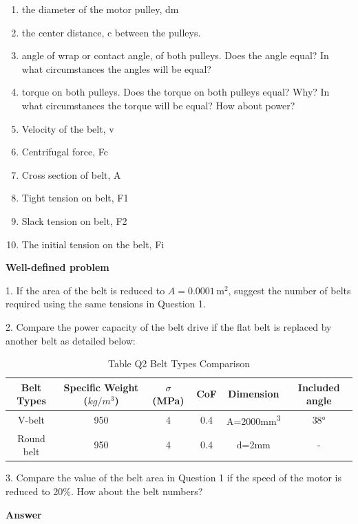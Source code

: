 \documentclass[a4paper, fleqn]{article}
\begin{document}
\begin{enumerate}[label=(\roman*)]
    \item the diameter of the motor pulley, dm
    \item the center distance, c between the pulleys.
    \item angle of wrap or contact angle, of both pulleys. Does the angle equal? In what circumstances the angles will be equal?
    \item torque on both pulleys. Does the torque on both pulleys equal? Why? In what circumstances the torque will be equal? How about power?
    \item Velocity of the belt, v
    \item Centrifugal force, Fc
    \item Cross section of belt, A
    \item Tight tension on belt, F1
    \item Slack tension on belt, F2
    \item The initial tension on the belt, Fi
\end{enumerate}

\newpage

\textbf{Well-defined problem}
\vspace{10pt}

1.	If the area of the belt is reduced to $A=0.0001 \, \text{m}^2$, suggest the number of belts required using the same tensions in Question 1.

2.	Compare the power capacity of the belt drive if the flat belt is replaced by another belt as detailed below: 

\begin{table}[h]
\centering
\begin{tabular}{|c|c|c|c|c|c|}
\hline
Belt Types & Specific Weight ($kg/m^3$) & $\sigma$ (MPa) & CoF & Dimension & Included angle \\
\hline
V-belt & 950 & 4 & 0.4 & A=2000mm\textsuperscript{3} & 38° \\
Round belt & 950 & 4 & 0.4 & d=2mm & - \\
\hline
\end{tabular}
\caption{Table Q2 Belt Types Comparison}
\end{table}

3.	  Compare the value of the belt area in Question 1 if the speed of the motor is reduced to 20\%. How about the belt numbers? 

\newpage

\textbf{Answer}
\end{document}
